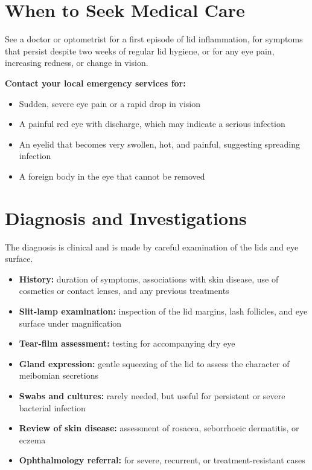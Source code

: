 \section*{When to Seek Medical Care}
See a doctor or optometrist for a first episode of lid inflammation, for symptoms that persist despite two weeks of regular lid hygiene, or for any eye pain, increasing redness, or change in vision.

\textbf{Contact your local emergency services for:}
\begin{itemize}
    \item Sudden, severe eye pain or a rapid drop in vision
    \item A painful red eye with discharge, which may indicate a serious infection
    \item An eyelid that becomes very swollen, hot, and painful, suggesting spreading infection
    \item A foreign body in the eye that cannot be removed
\end{itemize}

\section*{Diagnosis and Investigations}
The diagnosis is clinical and is made by careful examination of the lids and eye surface.

\begin{itemize}
    \item \textbf{History:} duration of symptoms, associations with skin disease, use of cosmetics or contact lenses, and any previous treatments
    \item \textbf{Slit-lamp examination:} inspection of the lid margins, lash follicles, and eye surface under magnification
    \item \textbf{Tear-film assessment:} testing for accompanying dry eye
    \item \textbf{Gland expression:} gentle squeezing of the lid to assess the character of meibomian secretions
    \item \textbf{Swabs and cultures:} rarely needed, but useful for persistent or severe bacterial infection
    \item \textbf{Review of skin disease:} assessment of rosacea, seborrhoeic dermatitis, or eczema
    \item \textbf{Ophthalmology referral:} for severe, recurrent, or treatment-resistant cases
\end{itemize}

